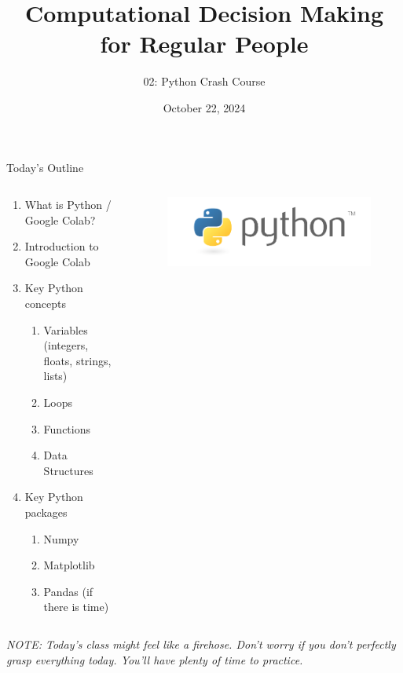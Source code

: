 \documentclass[10pt, aspectratio=169]{beamer}
\title{Computational Decision Making for Regular People}
\subtitle{02: Python Crash Course}
\date{October 22, 2024}
\begin{document}
\begin{frame}
    \maketitle
\end{frame}

\begin{frame}{Today's Outline}
    \begin{columns}
        \begin{column}{0.5\textwidth}
            \begin{enumerate}
                \item What is Python / Google Colab?
                \item Introduction to Google Colab
                \item Key Python concepts
                \begin{enumerate}
                    \item Variables (integers, floats, strings, lists)
                    \item Loops
                    \item Functions
                    \item Data Structures
                \end{enumerate}
                \item Key Python packages
                \begin{enumerate}
                    \item Numpy
                    \item Matplotlib
                    \item Pandas (if there is time)
                \end{enumerate}
            \end{enumerate}
        \end{column}
        \begin{column}{0.5\textwidth}
            \begin{figure}
                \includegraphics[width=0.95\linewidth]{PythonLogo.png}
            \end{figure}
        \end{column}
    \end{columns}
    \vspace{0.4cm}
    \textit{NOTE: Today's class might feel like a firehose. Don't worry if you don't perfectly grasp everything today. You'll have plenty of time to practice.}
\end{frame}
\end{document}
